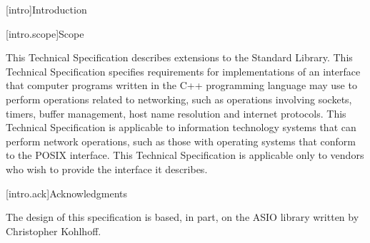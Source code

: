 
[intro]{Introduction}

[intro.scope]{Scope}

\pnum
 This Technical Specification describes extensions to the \Cpp Standard Library. This Technical Specification specifies requirements for implementations of an interface that computer programs written in the C++ programming language may use to perform operations related to networking, such as operations involving sockets, timers, buffer management, host name resolution and internet protocols. This Technical Specification is applicable to information technology systems that can perform network operations, such as those with operating systems that conform to the POSIX interface. This Technical Specification is applicable only to vendors who wish to provide the interface it describes.


[intro.ack]{Acknowledgments}

\pnum
The design of this specification is based, in part, on the ASIO library
written by Christopher Kohlhoff.


